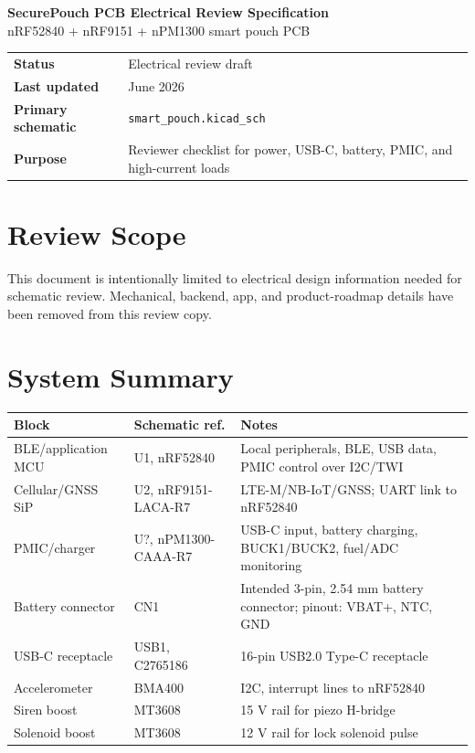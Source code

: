 \documentclass[11pt,a4paper]{article}
\begin{document}
\begin{center}
{\LARGE\bfseries SecurePouch PCB Electrical Review Specification}\\[0.4em]
{\large nRF52840 + nRF9151 + nPM1300 smart pouch PCB}\\[0.8em]
\begin{tabularx}{0.92\textwidth}{lL}
\textbf{Status} & Electrical review draft\\
\textbf{Last updated} & June 2026\\
\textbf{Primary schematic} & \texttt{smart\_pouch.kicad\_sch}\\
\textbf{Purpose} & Reviewer checklist for power, USB-C, battery, PMIC, and high-current loads\\
\end{tabularx}
\end{center}

\section{Review Scope}

This document is intentionally limited to electrical design information needed for schematic review.
Mechanical, backend, app, and product-roadmap details have been removed from this review copy.

\section{System Summary}

\begin{table}[h]
\small
\begin{tabularx}{\textwidth}{llL}
\toprule
\textbf{Block} & \textbf{Schematic ref.} & \textbf{Notes}\\
\midrule
BLE/application MCU & U1, nRF52840 & Local peripherals, BLE, USB data, PMIC control over I2C/TWI\\
Cellular/GNSS SiP & U2, nRF9151-LACA-R7 & LTE-M/NB-IoT/GNSS; UART link to nRF52840\\
PMIC/charger & U?, nPM1300-CAAA-R7 & USB-C input, battery charging, BUCK1/BUCK2, fuel/ADC monitoring\\
Battery connector & CN1 & Intended 3-pin, 2.54 mm battery connector; pinout: VBAT+, NTC, GND\\
USB-C receptacle & USB1, C2765186 & 16-pin USB2.0 Type-C receptacle\\
Accelerometer & BMA400 & I2C, interrupt lines to nRF52840\\
Siren boost & MT3608 & 15 V rail for piezo H-bridge\\
Solenoid boost & MT3608 & 12 V rail for lock solenoid pulse\\
\bottomrule
\end{tabularx}
\end{table}
\end{document}
